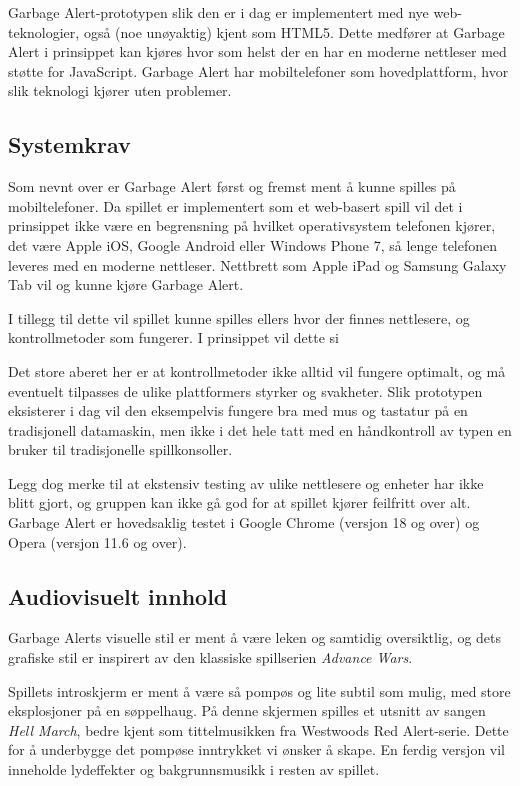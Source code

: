 
Garbage Alert-prototypen slik den er i dag er implementert med nye web-teknologier, også (noe unøyaktig) kjent som HTML5. Dette medfører at Garbage Alert i prinsippet kan kjøres hvor som helst der en har en moderne nettleser med støtte for JavaScript. Garbage Alert har mobiltelefoner som hovedplattform, hvor slik teknologi kjører uten problemer.


\subsection{Systemkrav}
Som nevnt over er Garbage Alert først og fremst ment å kunne spilles på mobiltelefoner.
Da spillet er implementert som et web-basert spill vil det i prinsippet ikke være en begrensning på hvilket operativsystem telefonen kjører, det være Apple iOS, Google Android eller Windows Phone 7, så lenge telefonen leveres med en moderne nettleser. Nettbrett som Apple iPad og Samsung Galaxy Tab vil og kunne kjøre Garbage Alert.

I tillegg til dette vil spillet kunne spilles ellers hvor der finnes nettlesere, og kontrollmetoder som fungerer. I prinsippet vil dette si


Det store aberet her er at kontrollmetoder ikke alltid vil fungere optimalt, og må eventuelt tilpasses de ulike plattformers styrker og svakheter. Slik prototypen eksisterer i dag vil den eksempelvis fungere bra med mus og tastatur på en tradisjonell datamaskin, men ikke i det hele tatt med en håndkontroll av typen en bruker til tradisjonelle spillkonsoller.

Legg dog merke til at ekstensiv testing av ulike nettlesere og enheter har ikke blitt gjort, og gruppen kan ikke gå god for at spillet kjører feilfritt over alt. Garbage Alert er hovedsaklig testet i Google Chrome (versjon 18 og over) og Opera (versjon 11.6 og over).


\subsection{Audiovisuelt innhold}
Garbage Alerts visuelle stil er ment å være leken og samtidig oversiktlig, og dets grafiske stil er inspirert av den klassiske spillserien \emph{Advance Wars}\cite{game:advancewars}.

Spillets introskjerm er ment å være så pompøs og lite subtil som mulig, med store eksplosjoner på en søppelhaug. På denne skjermen spilles et utsnitt av sangen \emph{Hell March}, bedre kjent som tittelmusikken fra Westwoods Red Alert-serie\cite{game:redalert}. Dette for å underbygge det pompøse inntrykket vi ønsker å skape. En ferdig versjon vil inneholde lydeffekter og bakgrunnsmusikk i resten av spillet.



